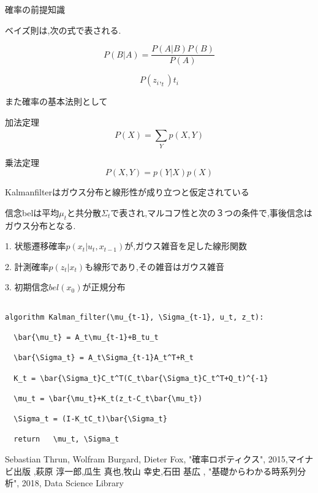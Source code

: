 \documentclass[12pt]{jsarticle}
\begin{document}
確率の前提知識

ベイズ則は,次の式で表される.

\begin{equation}
  P(B|A) = \frac{P(A|B)P(B)}{P(A)}
\end{equation}

\begin{equation}
 P(z_i,_t){t_i}
\end{equation}

また確率の基本法則として

加法定理
\begin{equation}
  P(X)=\sum_{Y}^{}{p(X,Y)}
\end{equation}

乗法定理
\begin{equation}
  P(X,Y)=p(Y|X)p(X)
\end{equation}


Kalmanfilterはガウス分布と線形性が成り立つと仮定されている

信念belは平均$\mu_t$と共分散$\Sigma_t$で表され,マルコフ性と次の３つの条件で,事後信念はガウス分布となる.

1. 状態遷移確率$p(x_t|u_t,x_{t-1})$が,ガウス雑音を足した線形関数

2. 計測確率$p(z_t|x_t)$も線形であり,その雑音はガウス雑音

3. 初期信念$bel(x_0)$が正規分布

\begin{lstlisting}[basicstyle=\ttfamily\footnotesize, frame=single]

algorithm Kalman_filter(\mu_{t-1}, \Sigma_{t-1}, u_t, z_t):

  \bar{\mu_t} = A_t\mu_{t-1}+B_tu_t

  \bar{\Sigma_t} = A_t\Sigma_{t-1}A_t^T+R_t

  K_t = \bar{\Sigma_t}C_t^T(C_t\bar{\Sigma_t}C_t^T+Q_t)^{-1}

  \mu_t = \bar{\mu_t}+K_t(z_t-C_t\bar{\mu_t})

  \Sigma_t = (I-K_tC_t)\bar{\Sigma_t}

  return   \mu_t, \Sigma_t

\end{lstlisting}

\begin{thebibliography}{9}
  Sebastian Thrun, Wolfram Burgard, Dieter Fox, "確率ロボティクス", 2015,マイナビ出版 
  ,萩原 淳一郎,瓜生 真也,牧山 幸史,石田 基広 , "基礎からわかる時系列分析", 2018, Data Science Library
\end{thebibliography}
\end{document}
